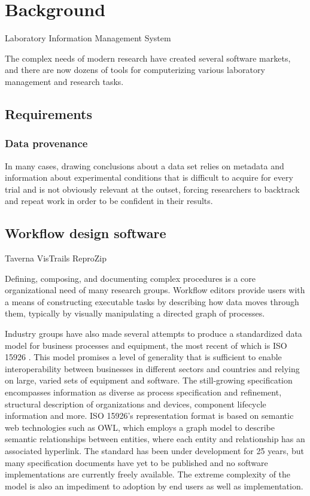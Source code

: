 \chapter{Background}



Laboratory Information Management System



The complex needs of modern research have created several software
markets, and there are now dozens of tools for computerizing various
laboratory management and research tasks.

\section{Requirements}

\subsection{Data provenance}
In many cases, drawing conclusions about a data set relies on
metadata and information about experimental conditions that is
difficult to acquire for every trial and is not obviously
relevant at the outset, forcing researchers to backtrack and repeat
work in order to be confident in their results.


\section{Workflow design software}

Taverna
VisTrails
ReproZip

Defining, composing, and documenting complex procedures is a core
organizational need of many research groups. Workflow editors provide
users with a means of constructing executable tasks by describing how
data moves through them, typically by visually manipulating a directed
graph of processes.

Industry groups have also made several attempts to produce a
standardized data model for business processes and equipment, the
most recent of which is ISO 15926 \cite{West2009}. This model promises
a level of generality that is sufficient to enable interoperability
between businesses in different sectors and countries and relying on
large, varied sets of equipment and software. The still-growing
specification encompasses information as diverse as process
specification and refinement, structural description of organizations
and devices, component lifecycle information and more. ISO 15926's
representation format is based on semantic web technologies such as OWL, which
employs a graph model to describe semantic relationships between
entities, where each entity and relationship has an associated
hyperlink. The standard has been under development for 25 years, but
many specification documents have yet to be published and no software
implementations are currently freely available. The extreme complexity
of the model is also an impediment to adoption by end users as well as
implementation.

